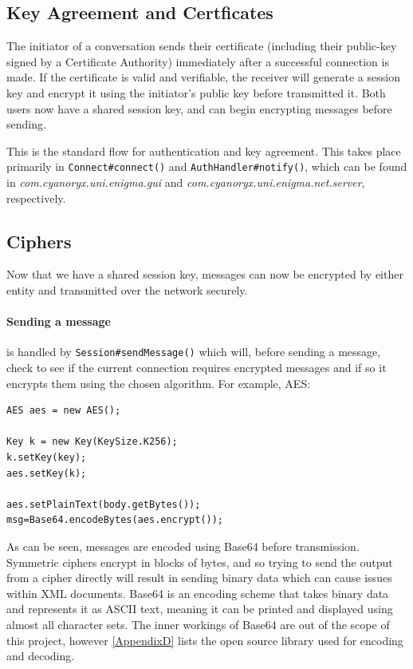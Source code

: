   \subsection{Key Agreement and Certficates}
  
  The initiator of a conversation sends their certificate (including their public-key signed by a Certificate Authority) immediately after a successful connection is made. If the certificate is valid and verifiable, the receiver will generate a session key and encrypt it using the initiator's public key before transmitted it. Both users now have a shared session key, and can begin encrypting messages before sending.
  
  This is the standard flow for authentication and key agreement. This takes place primarily in \verb!Connect#connect()! and \verb!AuthHandler#notify()!, which can be found in \emph{com.cyanoryx.uni.enigma.gui} and \emph{com.cyanoryx.uni.enigma.net.server}, respectively.
  
  \subsection{Ciphers}
  
  Now that we have a shared session key, messages can now be encrypted by either entity and transmitted over the network securely. 
  
  \paragraph{Sending a message} is handled by \verb!Session#sendMessage()! which will, before sending a message, check to see if the current connection requires encrypted messages and if so it encrypts them using the chosen algorithm. For example, AES: \\
  
  \begin{lstlisting}
AES aes = new AES();
				
Key k = new Key(KeySize.K256);
k.setKey(key);
aes.setKey(k);
			
aes.setPlainText(body.getBytes());
msg=Base64.encodeBytes(aes.encrypt());
\end{lstlisting}

  As can be seen, messages are encoded using Base64 before transmission. Symmetric ciphers encrypt in blocks of bytes, and so trying to send the output from a cipher directly will result in sending binary data which can cause issues within XML documents. Base64 is an encoding scheme that takes binary data and represents it as ASCII text, meaning it can be printed and displayed using almost all character sets. The inner workings of Base64 are out of the scope of this project, however \textsection\ref{AppendixD} lists the open source library used for encoding and decoding.
  
